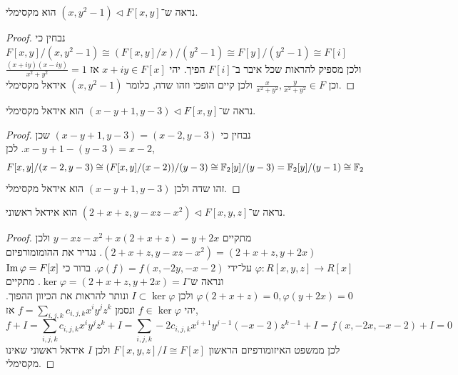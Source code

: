 \subquestion{}
נראה ש־$(x, y^2 - 1) \triangleleft F[x, y]$ הוא מקסימלי.
\begin{proof}
	נבחין כי $F[x, y] / (x, y^2 - 1) \cong (F[x, y] / x) / (y^2 - 1) \cong F[y] / (y^2 - 1) \cong F[i]$ ולכן מספיק להראות שכל איבר ב־$F[i]$ הפיך.
	יהי $x + i y \in F[x]$ אז $\frac{(x + i y)(x - i y)}{x^2 + y^2} = 1$ וכן $\frac{x}{x^2 + y^2}, \frac{y}{x^2 + y^2} \in F$ ולכן קיים הופכי וזהו שדה, כלומר $(x, y^2 - 1)$ אידאל מקסימלי.
\end{proof}

\subquestion{}
נראה ש־$(x - y + 1, y - 3) \triangleleft F[x, y]$ הוא אידאל מקסימלי.
\begin{proof}
	נבחין כי $(x - y + 1, y - 3) = (x - 2, y - 3)$ שכן $x - y + 1 - (y - 3) = x - 2$.
	לכן,
	\[
		F[x, y] / (x - 2, y - 3)
		\cong (F[x, y] / (x - 2)) / (y - 3)
		\cong \mathbb{F}_2[y] / (y - 3)
		= \mathbb{F}_2[y] / (y - 1)
		\cong \mathbb{F}_2
	\]
	זהו שדה ולכן $(x - y + 1, y - 3)$ הוא אידאל מקסימלי.
\end{proof}

\subquestion{}
נראה ש־$(2 + x + z, y - x z - x^2) \triangleleft F[x, y, z]$ הוא אידאל ראשוני.
\begin{proof}
	מתקיים $y - x z - x^2 + x (2 + x + z) = y + 2 x$ ולכן $(2 + x + z, y - x z - x^2) = (2 + x + z, y + 2 x)$.
	נגדיר את ההומומורפיזם $\varphi : R[x, y, z] \to R[x]$ על־ידי $\varphi(f) = f(x, -2 y, -x - 2)$. 
	ברור כי $\operatorname{Im} \varphi = F[x]$ ונראה ש־$\ker \varphi = (2 + x + z, y + 2 x) = I$.
	מתקיים $\varphi(2 + x + z) = 0, \varphi(y + 2 x) = 0$ ולכן $I \subset \ker \varphi$ ונותר להראות את הכיוון ההפוך.
	יהי $f \in \ker \varphi$ ונסמן $f = \sum_{i, j, k} c_{i, j, k} x^i y^j z^k$ אז,
	\[
		f + I
		= \sum_{i, j, k} c_{i, j, k} x^i y^j z^k + I
		= \sum_{i, j, k} -2 c_{i, j, k} x^{i + 1} y^{j - 1} (-x - 2) z^{k - 1} + I
		= f(x, -2x, -x - 2) + I
		= 0
	\]
	לכן ממשפט האיזומורפיזם הראשון $F[x, y, z] / I \cong F[x]$ ולכן $I$ אידאל ראשוני שאינו מקסימלי.
\end{proof}


